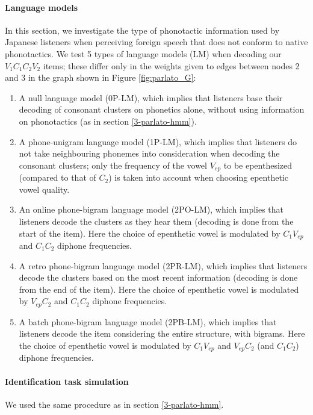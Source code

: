 \paragraph{Language models}
In this section, we investigate the type of phonotactic information used by Japanese listeners when perceiving foreign speech that does not conform to native phonotactics. We test 5 types of language models (LM) when decoding our $V_{1}C_{1}C_{2}V_{2}$ items; these differ only in the weights given to edges between nodes 2 and 3 in the graph shown in Figure \ref{fig:parlato_G}: 
\begin{enumerate}
    \item A null language model (\textsc{0P-LM}), which implies that listeners base their decoding of consonant clusters on phonetics alone, without using information on phonotactics (as in section \ref{3-parlato-hmm}).
    \item A phone-unigram language model (\textsc{1P-LM}), which implies that listeners do not take neighbouring phonemes into consideration when decoding the consonant clusters; only the frequency of the vowel $V_{ep}$ to be epenthesized (compared to that of $C_{2}$) is taken into account when choosing epenthetic vowel quality.
    \item An online phone-bigram language model (\textsc{2PO-LM}), which implies that listeners decode the clusters as they hear them (decoding is done from the start of the item). Here the choice of epenthetic vowel is modulated by $C_{1}V_{ep}$ and $C_{1}C_{2}$ diphone frequencies. 
    \item A retro phone-bigram language model (\textsc{2PR-LM}), which implies that listeners decode the clusters based on the most recent information (decoding is done from the end of the item). Here the choice of epenthetic vowel is modulated by $V_{ep}C_{2}$ and $C_{1}C_{2}$ diphone frequencies.
    \item A batch phone-bigram language model (\textsc{2PB-LM}), which implies that listeners decode the item considering the entire structure, with bigrams. Here the choice of epenthetic vowel is modulated by $C_{1}V_{ep}$ and $V_{ep}C_{2}$ (and $C_{1}C_{2}$) diphone frequencies.  
\end{enumerate}


\paragraph{Identification task simulation}
We used the same procedure as in section \ref{3-parlato-hmm}.

